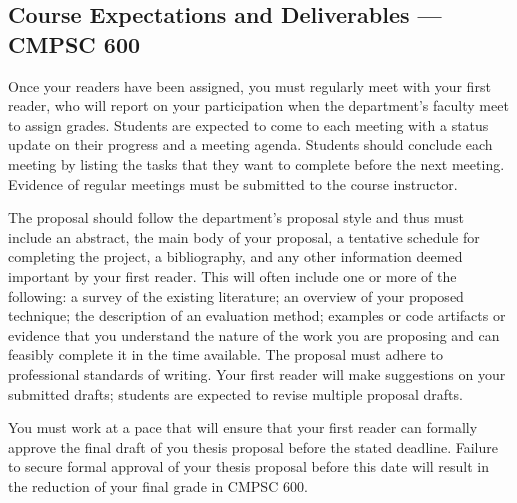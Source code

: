 

\subsection*{Course Expectations and Deliverables --- CMPSC 600}

\medskip
{} Once your readers have been assigned, you must regularly meet with your first reader, who
will report on your participation when the department's faculty meet to assign grades.  Students are expected to come to
each meeting with a status update on their progress and a meeting agenda.  Students should conclude each meeting by
listing the tasks that they want to complete before the next meeting. Evidence of regular meetings must be submitted
to the course instructor.

\medskip
{}
The proposal should follow the department's proposal style and thus must include an abstract, the main body of your
proposal, a tentative schedule for completing the project, a bibliography, and any other information deemed important by
your first reader. This will often include one or more of the following: a survey of the existing literature; an overview of
your proposed technique; the description of an evaluation method; examples or code artifacts or evidence that you
understand the nature of the work you are proposing and can feasibly complete it in the time available.
The proposal must adhere to professional standards of writing. Your first reader will make suggestions on your submitted
drafts; students are expected to revise multiple proposal drafts.

%
%

You must work at a pace that will ensure that your first reader can formally approve the final draft of you thesis
proposal before the stated deadline.  Failure to secure formal approval of your thesis proposal before this date will
result in the reduction of your final grade in CMPSC 600.

